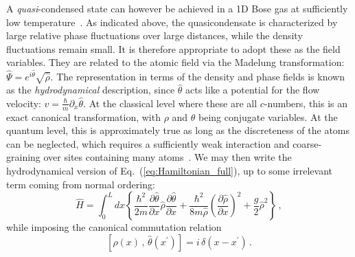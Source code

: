 \documentclass[aps,prd,notitlepage,amsfonts,amssymb,amsmath,nofootinbib,superscriptaddress,longbibliography]{revtex4-2}
\begin{document}
A {\it quasi}-condensed state can however be achieved in a 1D Bose gas at sufficiently low temperature~\cite{Petrov2004}.  As indicated above, the quasicondensate is characterized by large relative phase fluctuations over large distances, while the density fluctuations remain small.
It is therefore appropriate to adopt these as the field variables. They are related to the atomic field via the Madelung transformation: $\hat{\Psi} = e^{i \hat{\theta}} \sqrt{\hat{\rho}}$.
The representation in terms of the density and phase fields is known as the {\it hydrodynamical} description, since $\hat{\theta}$ acts like a potential for the flow velocity: $\hat{v} = \frac{\hbar}{m} \partial_{x}\hat{\theta}$. At the classical level where these are all $c$-numbers, this is an exact canonical transformation, with $\rho$ and $\theta$ being conjugate variables.  At the quantum level, this is approximately true as long as the discreteness of the atoms can be neglected, which requires a sufficiently weak interaction and coarse-graining over sites containing many atoms~\cite{Mora_2003}. We may then write the hydrodynamical version of Eq.~(\ref{eq:Hamiltonian_full}), up to some irrelevant term coming from normal ordering:
\begin{equation}
    \hat{H} = \int_{0}^{L} dx \left\{ \frac{\hbar^2}{2m} \frac{\partial \hat{\theta}}{\partial x} \hat{\rho} \frac{\partial \hat{\theta}}{\partial x} +  \frac{\hbar^2}{8m \hat{\rho}} \left( \frac{\partial \hat{\rho}}{\partial x} \right)^2  + \frac{g}{2} \hat{\rho}^2 \right\} \,,
\end{equation}
while imposing the canonical commutation relation
\begin{equation}
    \left[ \hat{\rho}\left(x\right) \,,\, \hat{\theta}\left(x^{\prime}\right) \right] = i \, \delta\left(x-x^{\prime}\right) \,.
    \label{eq:rho-theta-CCR}
\end{equation}
\end{document}
